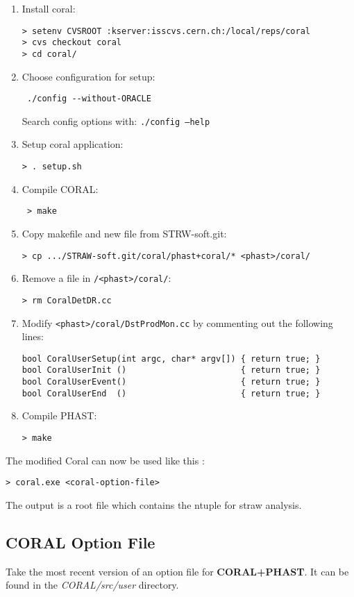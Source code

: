 \documentclass[a4paper,12pt]{article}
\begin{document}
\begin{enumerate}
 \item Install coral:
 \begin{verbatim}
> setenv CVSROOT :kserver:isscvs.cern.ch:/local/reps/coral
> cvs checkout coral
> cd coral/ 
 \end{verbatim}
 \item Choose configuration for setup:
 \begin{verbatim}
 ./config --without-ORACLE 
 \end{verbatim}
 Search config options with: {\tt ./config --help}
 \item Setup coral application:
 \begin{verbatim}
> . setup.sh  
 \end{verbatim}
\item Compile CORAL:
\begin{verbatim}
 > make
\end{verbatim}
\item Copy makefile and new file from STRW-soft.git:
\begin{verbatim}
> cp .../STRAW-soft.git/coral/phast+coral/* <phast>/coral/
\end{verbatim}
\item Remove a file in {\tt /<phast>/coral/}:
\begin{verbatim}
> rm CoralDetDR.cc
\end{verbatim}
\item Modify {\tt <phast>/coral/DstProdMon.cc} by commenting out the following lines:
\begin{verbatim}
bool CoralUserSetup(int argc, char* argv[]) { return true; }
bool CoralUserInit ()                       { return true; }
bool CoralUserEvent()                       { return true; }
bool CoralUserEnd  ()                       { return true; }
\end{verbatim}
\item Compile PHAST:
\begin{verbatim}
> make
\end{verbatim}
\end{enumerate}
The modified Coral can now be used like this :
\begin{verbatim}
> coral.exe <coral-option-file>
\end{verbatim}
The output is a root file which contains the ntuple for straw analysis.

\subsection{CORAL Option File}
Take the most recent version of an option file for {\bf CORAL+PHAST}.
It can be found in the {\it CORAL/src/user} directory.
\end{document}
